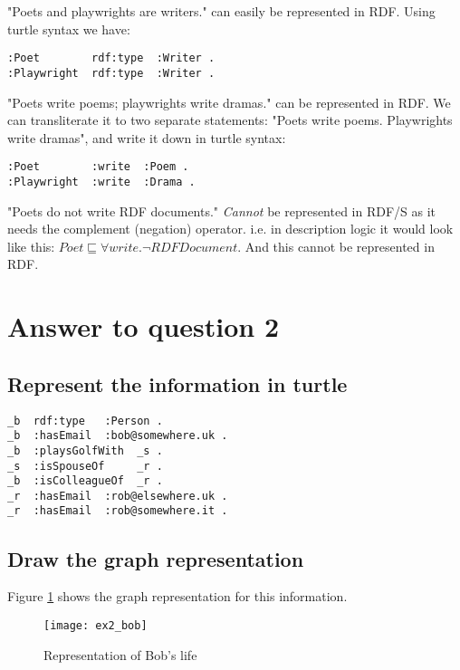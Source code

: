 \documentclass[a4paper,12pt]{article}
\begin{document}
"Poets and playwrights are writers." can easily be represented in RDF.  Using
turtle syntax we have:
\begin{Verbatim}[samepage=true]
:Poet        rdf:type  :Writer .
:Playwright  rdf:type  :Writer .
\end{Verbatim}

"Poets write poems; playwrights write dramas." can be represented in RDF.  We
can transliterate it to two separate statements:  "Poets write poems.
Playwrights write dramas", and write it down in turtle syntax:
\begin{Verbatim}[samepage=true]
:Poet        :write  :Poem .
:Playwright  :write  :Drama .
\end{Verbatim}

"Poets do not write RDF documents." \emph{Cannot} be represented in RDF/S as it
needs the complement (negation) operator.  i.e. in description logic it would
look like this: $Poet \sqsubseteq \forall write . \neg RDFDocument$.  And this
cannot be represented in RDF.

\section[Question 2]{Answer to question 2}

\subsection[Turtle]{Represent the information in turtle}
\begin{Verbatim}[samepage=true]
_b  rdf:type   :Person .
_b  :hasEmail  :bob@somewhere.uk .
_b  :playsGolfWith  _s .
_s  :isSpouseOf     _r .
_b  :isColleagueOf  _r .
_r  :hasEmail  :rob@elsewhere.uk .
_r  :hasEmail  :rob@somewhere.it .
\end{Verbatim}

\subsection[Graph]{Draw the graph representation}
Figure \ref{bobslife} shows the graph representation for this information.
\begin{figure}[!htp]
\centering
\texttt{[image: ex2\_bob]}
\caption{Representation of Bob's life}
\label{bobslife}
\end{figure}
\end{document}
